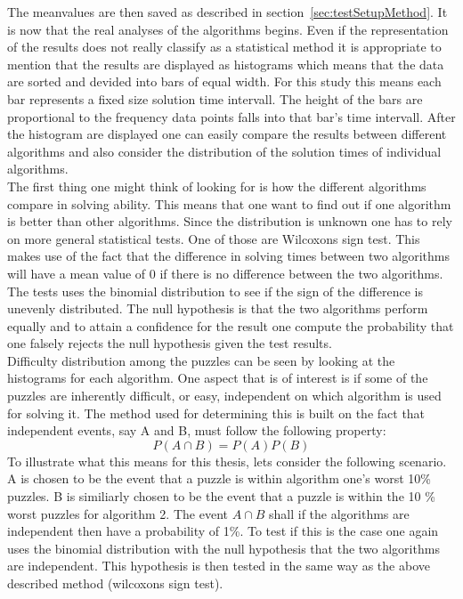 \documentclass[a4paper,11pt]{kth-mag}
\begin{document}
The meanvalues are then saved as described in section~\ref{sec:testSetupMethod}.
It is now that the real analyses of the algorithms begins. 
Even if the representation of the results does not really classify as a statistical method it is appropriate to mention that the results are displayed as histograms which means that the data are sorted and devided into bars of equal width. 
For this study this means each bar represents a fixed size solution time intervall. 
The height of the bars are proportional to the frequency data points falls into that bar's time intervall.
After the histogram are displayed one can easily compare the results between different algorithms and also consider the distribution of the solution times of individual algorithms.\\
The first thing one might think of looking for is how the different algorithms compare in solving ability. 
This means that one want to find out if one algorithm is better than other algorithms. 
Since the distribution is unknown one has to rely on more general statistical tests. 
One of those are Wilcoxons sign test. 
This makes use of the fact that the difference in solving times between two algorithms will have a mean value of 0 if there is no difference between the two algorithms. 
The tests uses the binomial distribution to see if the sign of the difference is unevenly distributed.
The null hypothesis is that the two algorithms perform equally and to attain a confidence for the result one compute the probability that one falsely rejects the null hypothesis given the test results.
\\
Difficulty distribution among the puzzles can be seen by looking at the histograms for each algorithm.
One aspect that is of interest is if some of the puzzles are inherently difficult, or easy, independent on which algorithm is used for solving it.
The method used for determining this is built on the fact that independent events, say A and B, must follow the following property:
\[
P(A \cap B) = P(A) P(B)
\] 
To illustrate what this means for this thesis, lets consider the following scenario.
A is chosen to be the event that a puzzle is within algorithm one's worst 10\% puzzles.
B is similiarly chosen to be the event that a puzzle is within the 10 \% worst puzzles for algorithm 2.
The event $A \cap B$ shall if the algorithms are independent then have a probability of 1\%.
To test if this is the case one again uses the binomial distribution with the null hypothesis that the two algorithms are independent.
This hypothesis is then tested in the same way as the above described method (wilcoxons sign test).
\end{document}
